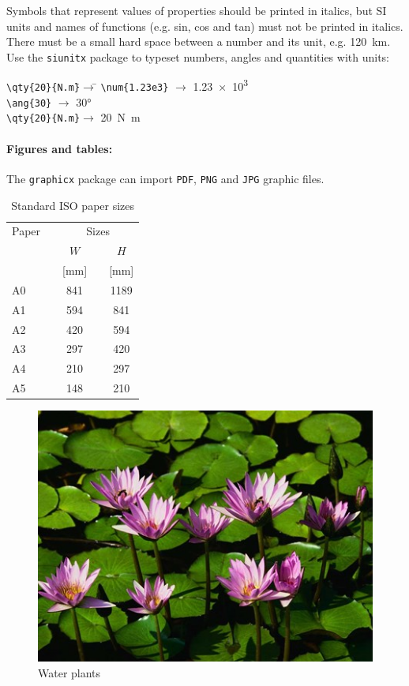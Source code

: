 Symbols that represent values of properties should be printed in italics, but SI units and names of functions (e.g. sin, cos and tan) must not be printed in italics. There must be a small hard space between a number and its unit, e.g. \qty{120}{km}. Use the \texttt{siunitx} package to typeset numbers, angles and quantities with units:
\begin{tabbing}
\hspace*{\parindent}\=\verb|\qty{20}{N.m}|\quad\=$\rightarrow$\quad\=\kill
    \>\verb|\num{1.23e3}| \>$\rightarrow$\> \num{1.23e3} \\
    \>\verb|\ang{30}|     \>$\rightarrow$\> \ang{30} \\
    \>\verb|\qty{20}{N.m}|\>$\rightarrow$\> \qty{20}{N.m}
\end{tabbing}

\paragraph{Figures and tables:}
The \texttt{graphicx} package can import \texttt{PDF}, \texttt{PNG} and \texttt{JPG} graphic files.

\begin{table}[htbp]
    \centering
    \caption{Standard ISO paper sizes}
    \label{tab:paper}
    \begin{tabular}{lcccc}
    \hline
        Paper\quad && \multicolumn{3}{c}{Sizes} \\
    \cline{2-5}
        &&  $W$      && $H$ \\
        && \small [mm] &&  \small [mm]   \\
    \cline{1-1}\cline{3-3}\cline{5-5}
        A0 && 841 && 1189 \\
        A1 && 594 &&  841 \\
        A2 && 420 &&  594 \\
        A3 && 297 &&  420 \\
        A4 && 210 &&  297 \\
        A5 && 148 &&  210 \\
    \hline
    \end{tabular}
\end{table}


\begin{figure}[htbp]
    \centering
    \includegraphics[scale=0.75]{figs/waterplants}
    \caption{Water plants}
    \label{fig:waterplant}
\end{figure}
